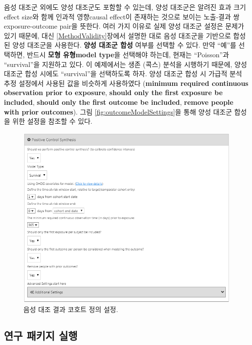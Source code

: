 \documentclass[10.5pt]{book}
\theoremstyle{definition}
\theoremstyle{definition}
\theoremstyle{definition}
\theoremstyle{remark}
\begin{document}
음성 대조군 외에도 양성 대조군도 포함할 수 있는데, 양성 대조군은 알려진
효과 크기effect size와 함께 인과적 영향causal effect이 존재하는 것으로
보이는 노출-결과 쌍exposure-outcome pair을 뜻한다. 여러 가지 이유로 실제
양성 대조군 설정은 문제가 있기 때문에, 대신 \ref{MethodValidity}장에서
설명한 대로 음성 대조군을 기반으로 합성된 양성 대조군을 사용한다.
\textbf{양성 대조군 합성} 여부를 선택할 수 있다. 만약 ``예''를 선택하면,
반드시 \textbf{모형 유형model type}을 선택해야 하는데, 현재는
``Poisson''과 ``survival''을 지원하고 있다. 이 예제에서는 생존 (콕스)
분석을 시행하기 때문에, 양성 대조군 합성 시에도 ``survival''을
선택하도록 하자. 양성 대조군 합성 시 가급적 분석 추정 설정에서 사용된
값을 비슷하게 사용하였다 (\textbf{minimum required continuous
observation prior to exposure}, \textbf{should only the first exposure
be included}, \textbf{should only the first outcome be included},
\textbf{remove people with prior outcomes}). 그림
\ref{fig:outcomeModelSettings}을 통해 양성 대조군 합성을 위한 설정을
참조할 수 있다.

\begin{figure}

{\centering \includegraphics[width=1\linewidth]{images/PopulationLevelEstimation/pcSynthesis} 

}

\caption{음성 대조 결과 코호트 정의 설정.}\label{fig:pcSynthesis}
\end{figure}

\subsection{연구 패키지 실행}\label{--}
\end{document}
